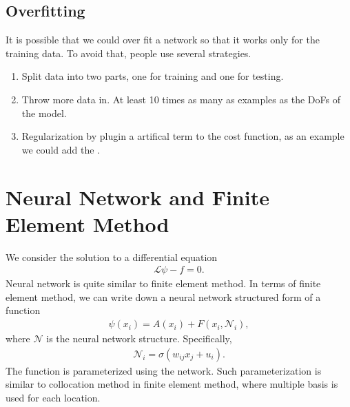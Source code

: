 \documentclass[letterpaper,12pt,english]{sphinxmanual}
\begin{document}
\subsection{Overfitting}
\label{\detokenize{artificial-neural-network/ann:overfitting}}
It is possible that we could over fit a network so that it works only for the training data. To avoid that, people use several strategies.
\begin{enumerate}
\item {} 
Split data into two parts, one for training and one for testing. 

\item {} 
Throw more data in. At least 10 times as many as examples as the DoFs of the model.  

\item {} 
Regularization by plugin a artifical term to the cost function, as an example we could add the . 

\end{enumerate}


\section{Neural Network and Finite Element Method}
\label{\detokenize{artificial-neural-network/neural-net-and-fem::doc}}\label{\detokenize{artificial-neural-network/neural-net-and-fem:neural-network-and-finite-element-method}}
We consider the solution to a differential equation
\begin{equation*}
\begin{split}\mathcal L \psi - f = 0.\end{split}
\end{equation*}
Neural network is quite similar to finite element method. In terms of finite element method, we can write down a neural network structured form of a function \label{\detokenize{artificial-neural-network/neural-net-and-fem:id1}}{\hyperref[\detokenize{artificial-neural-network/neural-net-and-fem:freitag2007}]{\sphinxcrossref{{[}Freitag2007{]}}}}
\begin{equation*}
\begin{split}\psi(x_i) = A(x_i) + F(x_i, \mathcal N_i),\end{split}
\end{equation*}
where \(\mathcal N\) is the neural network structure. Specifically,
\begin{equation*}
\begin{split}\mathcal N_i = \sigma( w_{ij} x_j + u_i ).\end{split}
\end{equation*}
The function is parameterized using the network. Such parameterization is similar to collocation method in finite element method, where multiple basis is used for each location.
\end{document}

